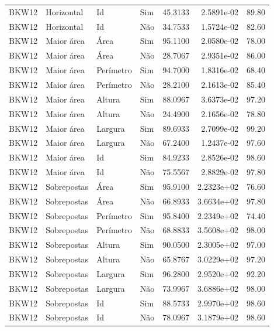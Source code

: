 \begin{tabular}{llllrrr}
    BKW12     & Horizontal  & Id        & Sim         & 45.3133      & 2.5891e-02 & 89.80    \\
    BKW12     & Horizontal  & Id        & Não         & 34.7533      & 1.5724e-02 & 82.60    \\
    BKW12     & Maior área  & Área      & Sim         & 95.1100      & 2.0580e-02 & 78.00    \\
    BKW12     & Maior área  & Área      & Não         & 28.7067      & 2.9351e-02 & 86.00    \\
    BKW12     & Maior área  & Perímetro & Sim         & 94.7000      & 1.8316e-02 & 68.40    \\
    BKW12     & Maior área  & Perímetro & Não         & 28.2100      & 2.1613e-02 & 85.40    \\
    BKW12     & Maior área  & Altura    & Sim         & 88.0967      & 3.6373e-02 & 97.20    \\
    BKW12     & Maior área  & Altura    & Não         & 24.4900      & 2.1656e-02 & 78.80    \\
    BKW12     & Maior área  & Largura   & Sim         & 89.6933      & 2.7099e-02 & 99.20    \\
    BKW12     & Maior área  & Largura   & Não         & 67.2400      & 1.2437e-02 & 97.60    \\
    BKW12     & Maior área  & Id        & Sim         & 84.9233      & 2.8526e-02 & 98.60    \\
    BKW12     & Maior área  & Id        & Não         & 75.5567      & 2.8829e-02 & 97.80    \\
    BKW12     & Sobrepostas & Área      & Sim         & 95.9100      & 2.2323e+02 & 76.60    \\
    BKW12     & Sobrepostas & Área      & Não         & 66.8933      & 3.6634e+02 & 97.80    \\
    BKW12     & Sobrepostas & Perímetro & Sim         & 95.8400      & 2.2349e+02 & 74.40    \\
    BKW12     & Sobrepostas & Perímetro & Não         & 68.8833      & 3.5608e+02 & 98.00    \\
    BKW12     & Sobrepostas & Altura    & Sim         & 90.0500      & 2.3005e+02 & 97.00    \\
    BKW12     & Sobrepostas & Altura    & Não         & 65.8767      & 3.0229e+02 & 97.20    \\
    BKW12     & Sobrepostas & Largura   & Sim         & 96.2800      & 2.9520e+02 & 92.20    \\
    BKW12     & Sobrepostas & Largura   & Não         & 73.9967      & 3.6886e+02 & 98.00    \\
    BKW12     & Sobrepostas & Id        & Sim         & 88.5733      & 2.9970e+02 & 98.60    \\
    BKW12     & Sobrepostas & Id        & Não         & 78.0967      & 3.1879e+02 & 98.60    \\
    \hline
\end{tabular}